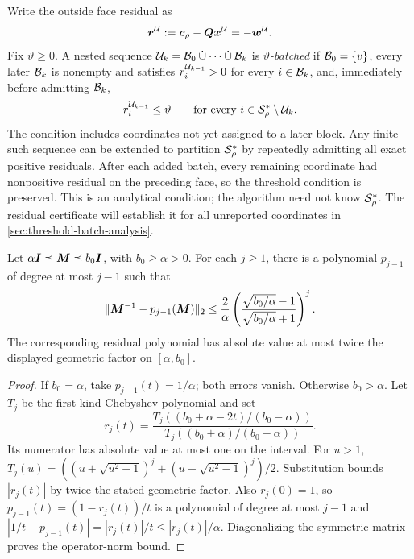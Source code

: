 Write the outside face residual as
\begin{equation*}
 \bm{r}^{\mathcal{U}}:=\bm{c}_\rho-\bm{Q}\bm{x}^{\mathcal{U}}=-\bm{w}^{\mathcal{U}}.
\end{equation*}
Fix $\vartheta\geq0$.  A nested sequence
$\mathcal{U}_k=\mathcal{B}_0\mathbin{\dot\cup}\cdots\mathbin{\dot\cup}\mathcal{B}_k$ is
\emph{$\vartheta$-batched} if $\mathcal{B}_0=\{v\}$, every later $\mathcal{B}_k$ is nonempty
and satisfies $r_i^{\mathcal{U}_{k-1}}>0$ for every $i\in\mathcal{B}_k$, and, immediately
before admitting $\mathcal{B}_k$,
\[
 r_i^{\mathcal{U}_{k-1}}\leq\vartheta
 \qquad\text{for every }i\in\mathcal{S}_\rho^*\setminus\mathcal{U}_k.
\]
The condition includes coordinates not yet assigned to a later block.
Any finite such sequence can be extended to partition $\mathcal{S}_\rho^*$ by
repeatedly admitting all exact positive residuals. After each added batch,
every remaining coordinate had nonpositive residual on the preceding face,
so the threshold condition is preserved. This is an analytical condition;
the algorithm need not know $\mathcal{S}_\rho^*$. The residual certificate will
establish it for all unreported coordinates in
\cref{sec:threshold-batch-analysis}.

\begin{lemma}
\label{lem:chebyshev-inverse}
Let $\alpha\bm{I}\preceq\bm{M}\preceq b_0\bm{I}$, with $b_0\geq\alpha>0$.
For each $j\geq1$, there is a polynomial $p_{j-1}$ of degree at most
$j-1$ such that
\begin{equation*}
 \lVert\bm{M}^{-1}-p_{j-1}(\bm{M})\rVert_2
 \leq\frac2\alpha
       \left(\frac{\sqrt{b_0/\alpha}-1}
                  {\sqrt{b_0/\alpha}+1}\right)^j.
\end{equation*}
The corresponding residual polynomial has absolute value at most twice
the displayed geometric factor on $[\alpha,b_0]$.
\end{lemma}
\begin{proof}
If $b_0=\alpha$, take $p_{j-1}(t)=1/\alpha$; both errors vanish.
Otherwise $b_0>\alpha$.
Let $T_j$ be the first-kind Chebyshev polynomial and set
\[
 r_j(t)=
 \frac{T_j((b_0+\alpha-2t)/(b_0-\alpha))}
      {T_j((b_0+\alpha)/(b_0-\alpha))}.
\]
Its numerator has absolute value at most one on the interval.
For $u>1$,
$T_j(u)=((u+\sqrt{u^2-1})^j+(u-\sqrt{u^2-1})^j)/2$.
Substitution bounds $|r_j(t)|$ by twice the stated geometric factor.
Also $r_j(0)=1$, so $p_{j-1}(t)=(1-r_j(t))/t$ is a polynomial of
degree at most $j-1$ and
$|1/t-p_{j-1}(t)|=|r_j(t)|/t\leq|r_j(t)|/\alpha$.
Diagonalizing the symmetric matrix proves the operator-norm bound.
\end{proof}

